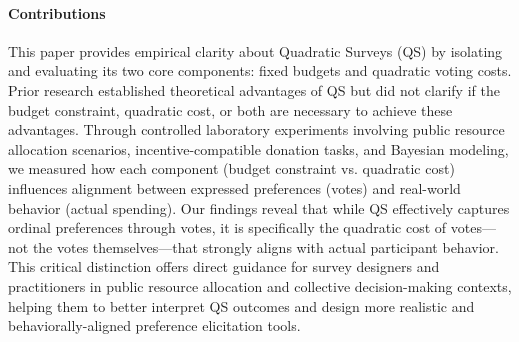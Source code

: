 \paragraph{Contributions} This paper provides empirical clarity about Quadratic Surveys (QS) by isolating and evaluating its two core components: fixed budgets and quadratic voting costs. Prior research established theoretical advantages of QS but did not clarify if the budget constraint, quadratic cost, or both are necessary to achieve these advantages. Through controlled laboratory experiments involving public resource allocation scenarios, incentive-compatible donation tasks, and Bayesian modeling, we measured how each component (budget constraint vs. quadratic cost) influences alignment between expressed preferences (votes) and real-world behavior (actual spending). Our findings reveal that while QS effectively captures ordinal preferences through votes, it is specifically the quadratic cost of votes—not the votes themselves—that strongly aligns with actual participant behavior. This critical distinction offers direct guidance for survey designers and practitioners in public resource allocation and collective decision-making contexts, helping them to better interpret QS outcomes and design more realistic and behaviorally-aligned preference elicitation tools.



